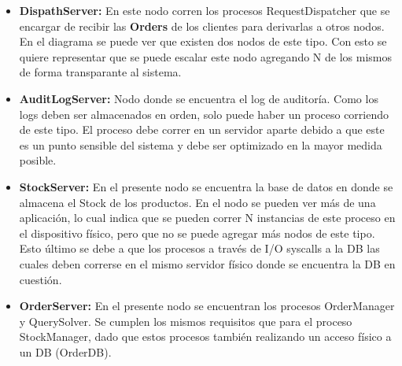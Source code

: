 \documentclass[a4paper,10pt]{article}
\begin{document}
        \begin{itemize}
            \item \textbf{DispathServer:} En este nodo corren los procesos
            RequestDispatcher que se encargar de recibir las \textbf{Orders}
            de los clientes para derivarlas a otros nodos. En el diagrama
            se puede ver que existen dos nodos de este tipo. Con esto se 
            quiere representar que se puede escalar este nodo agregando
            N de los mismos de forma transparante al sistema.
            \item \textbf{AuditLogServer:} Nodo donde se encuentra el log 
            de auditoría. Como los logs deben ser almacenados en orden, 
            solo puede haber un proceso corriendo de este tipo. El proceso
            debe correr en un servidor aparte debido a que este es un punto
            sensible del sistema y debe ser optimizado en la mayor medida
            posible.
            \item \textbf{StockServer:} En el presente nodo se encuentra 
            la base de datos en donde se almacena el Stock de los productos.
            En el nodo se pueden ver más de una aplicación, lo cual indica
            que se pueden correr N instancias de este proceso en el dispositivo
            físico, pero que no se puede agregar más nodos de este tipo. Esto
            último se debe a que los procesos a través de I/O syscalls a la 
            DB las cuales deben correrse en el mismo servidor físico donde
            se encuentra la DB en cuestión.
            \item \textbf{OrderServer:} En el presente nodo se encuentran los
            procesos OrderManager y QuerySolver. Se cumplen los mismos 
            requisitos que para el proceso StockManager, dado que estos 
            procesos también realizando un acceso físico a un DB (OrderDB).
           
        \end{itemize}
\end{document}
